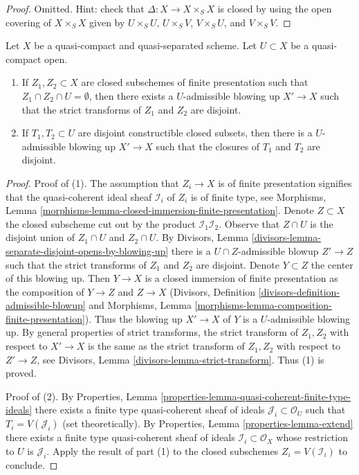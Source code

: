 \begin{proof}
Omitted. Hint: check that $\Delta : X \to X \times_S X$ is
closed by using the open covering of $X \times_S X$ given by
$U \times_S U$, $U \times_S V$, $V \times_S U$, and $V \times_S V$.
\end{proof}

\begin{lemma}
\label{lemma-separate-disjoint-locally-closed-by-blowing-up}
Let $X$ be a quasi-compact and quasi-separated scheme.
Let $U \subset X$ be a quasi-compact open.
\begin{enumerate}
\item If $Z_1, Z_2 \subset X$ are closed subschemes of finite
presentation such that $Z_1 \cap Z_2 \cap U = \emptyset$, then
there exists a $U$-admissible blowing up $X' \to X$
such that the strict transforms of $Z_1$ and $Z_2$ are disjoint.
\item If $T_1, T_2 \subset U$ are disjoint constructible closed subsets, then
there is a $U$-admissible blowing up $X' \to X$ such that the closures of
$T_1$ and $T_2$ are disjoint.
\end{enumerate}
\end{lemma}

\begin{proof}
Proof of (1). The assumption that $Z_i \to X$ is of finite presentation
signifies that the quasi-coherent ideal sheaf $\mathcal{I}_i$ of $Z_i$
is of finite type, see 
Morphisms, Lemma \ref{morphisms-lemma-closed-immersion-finite-presentation}.
Denote $Z \subset X$ the closed subscheme
cut out by the product $\mathcal{I}_1 \mathcal{I}_2$.
Observe that $Z \cap U$ is the disjoint union
of $Z_1 \cap U$ and $Z_2 \cap U$. By Divisors, Lemma
\ref{divisors-lemma-separate-disjoint-opens-by-blowing-up}
there is a $U \cap Z$-admissible blowup $Z' \to Z$ such that
the strict transforms of $Z_1$ and $Z_2$ are disjoint.
Denote $Y \subset Z$ the center of this blowing up.
Then $Y \to X$ is a closed immersion of finite presentation as the composition
of $Y \to Z$ and $Z \to X$ (Divisors, Definition
\ref{divisors-definition-admissible-blowup}
and Morphisms, Lemma \ref{morphisms-lemma-composition-finite-presentation}).
Thus the blowing up $X' \to X$ of $Y$ is a $U$-admissible blowing
up. By general properties of strict transforms, the
strict transform of $Z_1, Z_2$ with respect to $X' \to X$
is the same as the strict transform of $Z_1, Z_2$ with respect
to $Z' \to Z$, see
Divisors, Lemma \ref{divisors-lemma-strict-transform}.
Thus (1) is proved.

\medskip\noindent
Proof of (2). By Properties, Lemma
\ref{properties-lemma-quasi-coherent-finite-type-ideals}
there exists a finite type quasi-coherent sheaf of ideals
$\mathcal{J}_i \subset \mathcal{O}_U$ such that
$T_i = V(\mathcal{J}_i)$ (set theoretically).
By Properties, Lemma \ref{properties-lemma-extend}
there exists a finite type quasi-coherent sheaf
of ideals $\mathcal{I}_i \subset \mathcal{O}_X$
whose restriction to $U$ is $\mathcal{J}_i$.
Apply the result of part (1) to the closed
subschemes $Z_i = V(\mathcal{I}_i)$ to conclude.
\end{proof}

